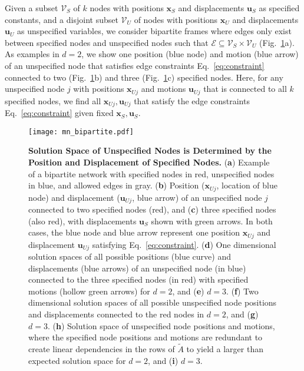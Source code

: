 \documentclass[%
preprint,
 amsmath,amssymb,
 aps,
]{revtex4-1}
\newcommand{\mc}{\mathcal}
\begin{document}
Given a subset $\mc{V}_S$ of $k$ nodes with positions $\bm{x}_S$ and displacements $\bm{u}_S$ as specified constants, and a disjoint subset $\mc{V}_U$ of nodes with positions $\bm{x}_U$ and displacements $\bm{u}_U$ as unspecified variables, we consider bipartite frames where edges only exist between specified nodes and unspecified nodes such that $\mc E \subseteq \mc V_S \times \mc V_U$ (Fig.~\ref{fig:mn_bipartite}a). As examples in $d=2$, we show one position (blue node) and motion (blue arrow) of an unspecified node that satisfies edge constraints Eq.~\ref{eq:constraint} connected to two (Fig.~\ref{fig:mn_bipartite}b) and three (Fig.~\ref{fig:mn_bipartite}c) specified nodes. Here, for any unspecified node $j$ with positions $\bm{x}_{Uj}$ and motions $\bm{u}_{Uj}$ that is connected to all $k$ specified nodes, we find all $\bm{x}_{Uj}, \bm{u}_{Uj}$ that satisfy the edge constraints Eq.~\ref{eq:constraint} given fixed $\bm{x}_S, \bm{u}_S$. 

\begin{figure}[h!]
	\centering
	\texttt{[image: mn\_bipartite.pdf]}
	\caption{\textbf{Solution Space of Unspecified Nodes is Determined by the Position and Displacement of Specified Nodes.} (\textbf{a}) Example of a bipartite network with specified nodes in red, unspecified nodes in blue, and allowed edges in gray. (\textbf{b}) Position ($\bm{x}_{Uj}$, location of blue node) and displacement ($\bm{u}_{Uj}$, blue arrow) of an unspecified node $j$ connected to two specified nodes (red), and (\textbf{c}) three specified nodes (also red), with displacements $\bm{u}_S$ shown with green arrows. In both cases, the blue node and blue arrow represent one position $\bm{x}_{Uj}$ and displacement $\bm{u}_{Uj}$ satisfying Eq.~\ref{eq:constraint}. (\textbf{d}) One dimensional solution spaces of all possible positions (blue curve) and displacements (blue arrows) of an unspecified node (in blue) connected to the three specified nodes (in red) with specified motions (hollow green arrows) for $d = 2$, and (\textbf{e}) $d = 3$. (\textbf{f}) Two dimensional solution spaces of all possible unspecified node positions and displacements connected to the red nodes in $d = 2$, and (\textbf{g}) $d = 3$. (\textbf{h}) Solution space of unspecified node positions and motions, where the specified node positions and motions are redundant to create linear dependencies in the rows of $\tilde{A}$ to yield a larger than expected solution space for $d = 2$, and (\textbf{i}) $d = 3$.}
	\label{fig:mn_bipartite}
\end{figure}
\end{document}
